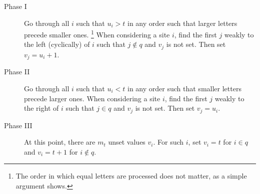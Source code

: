 \documentclass[reqno]{amsart}
\newcommand{\0}{\phantom{c}}
\theoremstyle{plain}
\theoremstyle{definition}
\numberwithin{equation}{section}
\begin{document}
\begin{description}
\item[Phase I]
  Go through all $i$ such that $u_i > t$ in any order such that larger letters precede smaller ones.%
  \footnote{The order in which equal letters are processed does not matter, as a simple argument shows.}
  When considering a site $i$, find the first $j$ weakly to the left (cyclically) of $i$ such that $j \notin q$ and $v_j$ is not set.
  Then set $v_j = u_i + 1$.

\item[Phase II]
  Go through all $i$ such that $u_i < t$ in any order such that smaller letters precede larger ones.
  When considering a site $i$, find the first $j$ weakly to the right of $i$ such that $j \in q$ and $v_j$ is not set.
  Then set $v_j = u_i$.

\item[Phase III]
  At this point, there are $m_t$ unset values $v_i$. For such $i$, set $v_i = t$ for $i \in q$ and $v_i = t+1$ for $i\notin q$.
\end{description}
\end{document}
